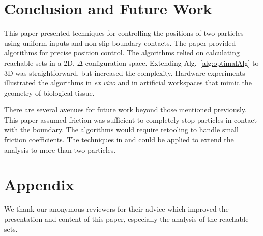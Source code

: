 \section{Conclusion and Future Work}\label{sec:conclusion}

This paper presented techniques for controlling the positions of two particles using uniform inputs and non-slip boundary contacts.  
The paper provided algorithms for precise position control. The algorithms relied on calculating reachable sets in a 2D, $\Delta$ configuration space.
Extending Alg.~\ref{alg:optimalAlg}  to 3D was straightforward, but increased the complexity.
Hardware experiments illustrated the algorithms in \emph{ex vivo} and in artificial workspaces that mimic the geometry of biological tissue.

There are several avenues for future work beyond those mentioned previously. This paper assumed friction was sufficient to completely stop particles in contact with the boundary. 
  The algorithms would require retooling to handle small friction coefficients. The techniques in \cite{shahrokhi2017algorithms} and  \cite{AaronManipulation2013} could be applied to extend the analysis to more than two particles.
  
  \section*{Appendix}\label{sec:appendix}
We thank our anonymous reviewers for their advice which improved the presentation and content of this paper, especially the analysis of the reachable sets.

